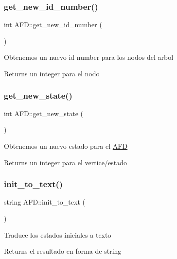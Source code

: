 \subsubsection{\texorpdfstring{get\+\_\+new\+\_\+id\+\_\+number()}{get\_new\_id\_number()}}
{\footnotesize\ttfamily int A\+F\+D\+::get\+\_\+new\+\_\+id\+\_\+number (\begin{DoxyParamCaption}{ }\end{DoxyParamCaption})}

Obtenemos un nuevo id number para los nodos del arbol \begin{DoxyReturn}{Returns}
un integer para el nodo 
\end{DoxyReturn}
\hypertarget{class_a_f_d_adc0b42986b4299eaaeb0c4384e9c0a2d}{}\label{class_a_f_d_adc0b42986b4299eaaeb0c4384e9c0a2d} 
\subsubsection{\texorpdfstring{get\+\_\+new\+\_\+state()}{get\_new\_state()}}
{\footnotesize\ttfamily int A\+F\+D\+::get\+\_\+new\+\_\+state (\begin{DoxyParamCaption}{ }\end{DoxyParamCaption})}

Obtenemos un nuevo estado para el \hyperlink{class_a_f_d}{A\+FD} \begin{DoxyReturn}{Returns}
un integer para el vertice/estado 
\end{DoxyReturn}
\hypertarget{class_a_f_d_ae2bf9a8a6511e585c911ff1c2416bb3e}{}\label{class_a_f_d_ae2bf9a8a6511e585c911ff1c2416bb3e} 
\subsubsection{\texorpdfstring{init\+\_\+to\+\_\+text()}{init\_to\_text()}}
{\footnotesize\ttfamily string A\+F\+D\+::init\+\_\+to\+\_\+text (\begin{DoxyParamCaption}{ }\end{DoxyParamCaption})}

Traduce los estados iniciales a texto \begin{DoxyReturn}{Returns}
el resultado en forma de string 
\end{DoxyReturn}
\hypertarget{class_a_f_d_a1c7d05c678a6cc4e31c2b4cb93b6408e}{}\label{class_a_f_d_a1c7d05c678a6cc4e31c2b4cb93b6408e} 
